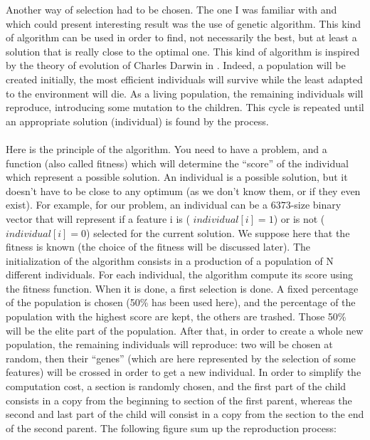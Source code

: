 \documentclass{report}
\begin{document}
		Another way of selection had to be chosen. The one I was familiar with and which could present interesting result was the use of genetic algorithm. This kind of algorithm can be used in order to find, not necessarily the best, but at least a solution that is really close to the optimal one. This kind of algorithm is inspired by the theory of evolution of Charles Darwin in \cite{darwin1859origins}. Indeed, a population will be created initially, the most efficient individuals will survive while the least adapted to the environment will die. As a living population, the remaining individuals will reproduce, introducing some mutation to the children. This cycle is repeated until an appropriate solution (individual) is found by the process.\\\\
		Here is the principle of the algorithm. You need to have a problem, and a function (also called fitness) which will determine the “score” of the individual which represent a possible solution. An individual is a possible solution, but it doesn't have to be close to any optimum (as we don't know them, or if they even exist). For example, for our problem, an individual can be a $6373$-size binary vector that will represent if a feature i is ( $individual[i] = 1$) or is not ($individual[i] = 0$) selected for the current solution. We suppose here that the fitness is known (the choice of the fitness will be discussed later).
		The initialization of the algorithm consists in a production of a population of N different individuals. For each individual, the algorithm compute its score using the fitness function. When it is done, a first selection is done. A fixed percentage of the population is chosen (50\% has been used here), and the percentage of the population with the highest score are kept, the others are trashed. Those 50\% will be the elite part of the population. After that, in order to create a whole new population, the remaining individuals will reproduce: two will be chosen at random, then their “genes” (which are here represented by the selection of some features) will be crossed in order to get a new individual. In order to simplify the computation cost, a section is randomly chosen, and the first part of the child consists in a copy from the beginning to section of the first parent, whereas the second and last part of the child will consist in a copy from the section to the end of the second parent. The following figure sum up the reproduction process:
		
\end{document}
